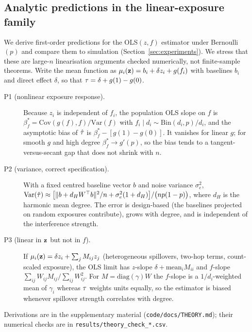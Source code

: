 \subsection{Analytic predictions in the linear-exposure family}
We derive first-order predictions for the OLS$(z,f)$ estimator under Bernoulli$(p)$ and compare them to simulation (Section~\ref{sec:experiments}). We stress that these are large-$n$ linearisation arguments checked numerically, not finite-sample theorems. Write the mean function as $\mu_i(\mathbf{z})=b_i+\delta z_i+g(f_i)$ with baselines $b_i$ and direct effect $\delta$, so that $\tau=\delta+g(1)-g(0)$.
\begin{description}
\item[P1 (nonlinear exposure response).] Because $z_i$ is independent of $f_i$, the population OLS slope on $f$ is $\beta_f^*=\mathrm{Cov}(g(f),f)/\mathrm{Var}(f)$ with $f_i\mid d_i\sim\mathrm{Bin}(d_i,p)/d_i$, and the asymptotic bias of $\hat{\tau}$ is $\beta_f^*-[g(1)-g(0)]$. It vanishes for linear $g$; for smooth $g$ and high degree $\beta_f^*\to g'(p)$, so the bias tends to a tangent-versus-secant gap that does not shrink with $n$.
\item[P2 (variance, correct specification).] With a fixed centred baseline vector $b$ and noise variance $\sigma_e^2$, $\mathrm{Var}(\hat{\tau})\approx\bigl[\|b+d_HW^\top b\|^2/n+\sigma_e^2(1+d_H)\bigr]/\bigl(np(1-p)\bigr)$, where $d_H$ is the harmonic mean degree. The error is design-based (the baselines projected on random exposures contribute), grows with degree, and is independent of the interference strength.
\item[P3 (linear in $\mathbf{z}$ but not in $f$).] If $\mu_i(\mathbf{z})=\delta z_i+\sum_jM_{ij}z_j$ (heterogeneous spillovers, two-hop terms, count-scaled exposure), the OLS limit has $z$-slope $\delta+\mathrm{mean}_iM_{ii}$ and $f$-slope $\sum_{ij}W_{ij}M_{ij}/\sum_{ij}W_{ij}^2$. For $M=\mathrm{diag}(\gamma)W$ the $f$-slope is a $1/d_i$-weighted mean of $\gamma_i$ whereas $\tau$ weights units equally, so the estimator is biased whenever spillover strength correlates with degree.
\end{description}
Derivations are in the supplementary material (\texttt{code/docs/THEORY.md}); their numerical checks are in \texttt{results/theory\_check\_*.csv}.
